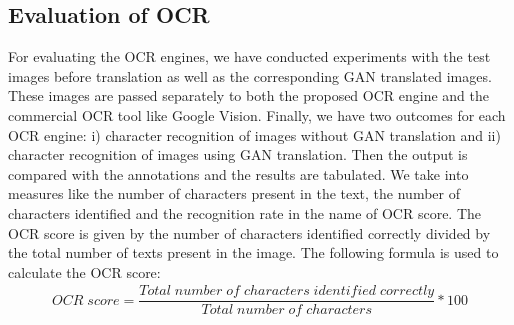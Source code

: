 \subsection{Evaluation of OCR}
	For evaluating the OCR engines, we have conducted experiments with the test images before translation as well as the corresponding GAN translated images. These images are passed separately to both the proposed OCR engine and the commercial OCR tool like Google Vision. Finally, we have two outcomes for each OCR engine: i) character recognition of images without GAN translation and ii) character recognition of images using GAN translation. Then the output is compared with the annotations and the results are tabulated. We take into measures like the number of characters present in the text, the number of characters identified and the recognition rate in the name of OCR score. The OCR score is given by the number of characters identified correctly divided by the total number of texts present in the image. 
The following formula is used to calculate the OCR score: 
\begin{align*}
OCR \; score = \dfrac{Total \; number \; of \; characters \; identified \; correctly}{Total \; number \; of \; characters} * 100
\end{align*}
